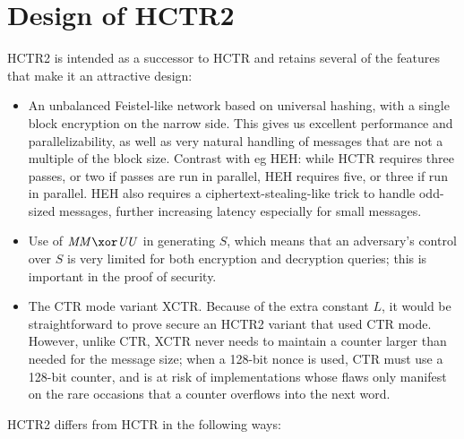 \documentclass[hctr.tex]{subfiles}
\begin{document}
\section{Design of HCTR2}\label{design}
HCTR2 is intended as a successor to HCTR and retains several of the
features that make it an attractive design:
\begin{itemize}
    \item An unbalanced Feistel-like network based on universal
    hashing, with a single block encryption on the narrow side.
    This gives us excellent performance and parallelizability,
    as well as very natural handling of messages that are not
    a multiple of the block size. Contrast with eg HEH\cite{heh}:
    while HCTR requires three passes, or two if passes are
    run in parallel, HEH requires five, or three if run in parallel.
    HEH also requires a ciphertext-stealing-like trick to
    handle odd-sized messages, further increasing
    latency especially for small messages.
    \item Use of \(\MM \xor \UU\) in generating \(S\), which means
    that an adversary's control over \(S\) is very limited for both
    encryption and decryption queries; this is important in the
    proof of security.
    \item The CTR mode variant XCTR.
    Because of the extra constant \(L\), it would be straightforward
    to prove secure an HCTR2 variant that used CTR mode.
    However, unlike CTR, XCTR
    never needs to maintain a counter larger
    than needed for the message size;
    when a 128-bit nonce is used, CTR 
    must use a 128-bit counter, and is
    at risk of implementations
    whose flaws only manifest on the
    rare occasions that a counter overflows
    into the next word.
\end{itemize}

HCTR2 differs from HCTR in the following ways:
\end{document}
